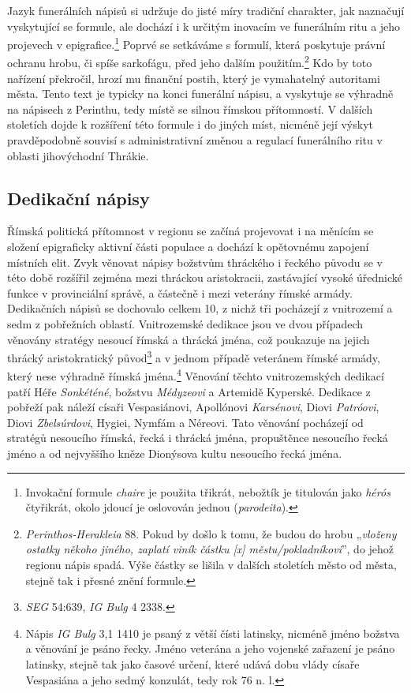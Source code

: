 Jazyk funerálních nápisů si udržuje do jisté míry tradiční charakter, jak naznačují vyskytující se formule, ale dochází i k určitým inovacím ve funerálním ritu a jeho projevech v epigrafice.\footnote{Invokační formule {\em chaire} je použita třikrát, nebožtík je titulován jako {\em hérós} čtyřikrát, okolo jdoucí je oslovován jednou ({\em parodeita}).} Poprvé se setkáváme s formulí, která poskytuje právní ochranu hrobu, či spíše sarkofágu, před jeho dalším použitím.\footnote{{\em Perinthos-Herakleia} 88. Pokud by došlo k tomu, že budou do hrobu „{\em vloženy ostatky někoho jiného, zaplatí viník částku {[}x{]} městu/pokladníkovi}”, do jehož regionu nápis spadá. Výše částky se lišila v dalších stoletích město od města, stejně tak i přesné znění formule.} Kdo by toto nařízení překročil, hrozí mu finanční postih, který je vymahatelný autoritami města. Tento text je typicky na konci funerální nápisu, a vyskytuje se výhradně na nápisech z Perinthu, tedy místě se silnou římskou přítomností. V dalších stoletích dojde k rozšíření této formule i do jiných míst, nicméně její výskyt pravděpodobně souvisí s administrativní změnou a regulací funerálního ritu v oblasti jihovýchodní Thrákie.

\subsection[dedikační-nápisy-11]{Dedikační nápisy}

Římská politická přítomnost v regionu se začíná projevovat i na měnícím se složení epigraficky aktivní části populace a dochází k opětovnému zapojení místních elit. Zvyk věnovat nápisy božstvům thráckého i řeckého původu se v této době rozšířil zejména mezi thráckou aristokracii, zastávající vysoké úřednické funkce v provinciální správě, a částečně i mezi veterány římské armády. Dedikačních nápisů se dochovalo celkem 10, z nichž tři pocházejí z vnitrozemí a sedm z pobřežních oblastí. Vnitrozemské dedikace jsou ve dvou případech věnovány stratégy nesoucí římská a thrácká jména, což poukazuje na jejich thrácký aristokratický původ\footnote{{\em SEG} 54:639, {\em IG Bulg} 4 2338.} a v jednom případě veteránem římské armády, který nese výhradně římská jména.\footnote{Nápis {\em IG Bulg} 3,1 1410 je psaný z větší čísti latinsky, nicméně jméno božstva a věnování je psáno řecky. Jméno veterána a jeho vojenské zařazení je psáno latinsky, stejně tak jako časové určení, které udává dobu vlády císaře Vespasiána a jeho sedmý konzulát, tedy rok 76 n. l.} Věnování těchto vnitrozemských dedikací patří Héře {\em Sonkéténé}, božstvu {\em Médyzeovi} a Artemidě Kyperské. Dedikace z pobřeží pak náleží císaři Vespasiánovi, Apollónovi {\em Karsénovi}, Diovi {\em Patróovi}, Diovi {\em Zbelsúrdovi}, Hygiei, Nymfám a Néreovi. Tato věnování pocházejí od stratégů nesoucího římská, řecká i thrácká jména, propuštěnce nesoucího řecká jméno a od nejvyššího kněze Dionýsova kultu nesoucího řecká jména.

